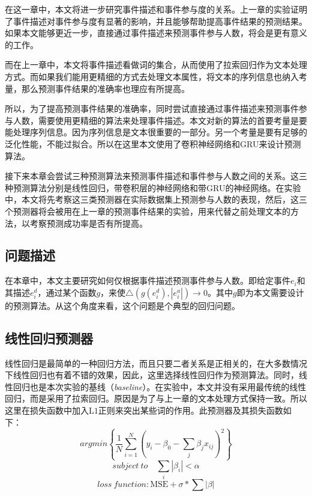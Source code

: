     
% 
在这一章中，本文将进一步研究事件描述和事件参与度的关系。上一章的实验证明了事件描述对事件参与度有显著的影响，并且能够帮助提高事件结果的预测结果。如果本文能够更近一步，直接通过事件描述来预测事件参与人数，将会是更有意义的工作。

而在上一章中，本文将事件描述看做词的集合，从而使用了拉索回归作为文本处理方式。而如果我们能用更精细的方式去处理文本属性，将文本的序列信息也纳入考量，那么预测事件结果的准确率也理应有所提高。

所以，为了提高预测事件结果的准确率，同时尝试直接通过事件描述来预测事件参与人数，需要使用更精细的算法来处理事件描述。本文对新的算法的首要考量是要能处理序列信息。因为序列信息是文本很重要的一部分。另一个考量是要有足够的泛化性能，不能过拟合。所以在这里本文使用了卷积神经网络和GRU来设计预测算法。

接下来本章会尝试三种预测算法来预测事件描述和事件参与人数之间的关系。这三种预测算法分别是线性回归，带卷积层的神经网络和带GRU的神经网络。在实验中，本文将先考察这三类预测器在实际数据集上预测参与人数的表现，然后，这三个预测器将会被用在上一章的预测事件结果的实验，用来代替之前处理文本的方法，以考察预测成功率是否有所提高。

\subsection{问题描述}
在本章中，本文主要研究如何仅根据事件描述预测事件参与人数。即给定事件$e_i$和其描述$e_i^d$，通过某个函数$g$，来使$\bigtriangleup(g(e_i^d),|e_i^a|)\to 0$。其中$g$即为本文需要设计的预测算法。从这个角度来看，这个问题是个典型的回归问题。
\subsection{线性回归预测器}
线性回归是最简单的一种回归方法，而且只要二者关系是正相关的，在大多数情况下线性回归也有着不错的效果，因此，这里选择线性回归作为预测算法。同时，线性回归也是本次实验的基线（\textit{baseline}）。在实验中，本文并没有采用最传统的线性回归，而是采用了拉索回归。原因是为了与上一章的文本处理方式保持一致。所以这里在损失函数中加入$\mathrm{L1}$正则来突出某些词的作用。此预测器及其损失函数如下：
\begin{equation}
argmin\left\{\frac{1}{N}\displaystyle\sum_{i=1}^{N}
(y_i-\beta_0-\displaystyle\sum_{j}\beta_jx_{ij})^2\right\}
\end{equation}
\begin{equation}
subject\ to \quad \displaystyle\sum_{i}|\beta_i|<\alpha
\end{equation}
\begin{equation}
loss\ function: \mathrm{MSE}+\sigma*\sum|\beta|
\end{equation}

